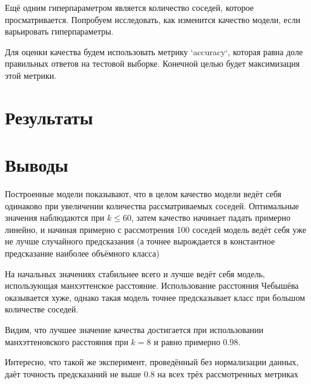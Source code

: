 \documentclass{article}
\begin{document}
\bigskip
Ещё одним гиперпараметром является количество соседей, которое просматривается. Попробуем исследовать, как изменится качество модели, если варьировать гиперпараметры.

Для оценки качества будем использовать метрику `accuracy`, которая равна доле правильных ответов на тестовой выборке. Конечной целью будет максимизация этой метрики.

\section{Результаты}

\begin{center}
\end{center}

\section{Выводы}

Построенные модели показывают, что в целом качество модели ведёт себя одинаково при увеличении количества рассматриваемых соседей. Оптимальные значения наблюдаются при $k \leqslant 60$, затем качество начинает падать примерно линейно, и  начиная примерно с рассмотрения 100 соседей модель ведёт себя уже не лучше случайного предсказания (а точнее вырождается в константное предсказание наиболее объёмного класса)

На начальных значениях стабильнее всего и лучше ведёт себя модель, использующая манхэттенское расстояние. Использование расстояния Чебышёва оказывается хуже, однако такая модель точнее предсказывает класс при большом количестве соседей.

Видим, что лучшее значение качества достигается при использовании манхэттеновского расстояния при $k = 8$ и равно примерно $0.98$.

Интересно, что такой же эксперимент, проведённый без нормализации данных, даёт точность предсказаний не выше $0.8$ на всех трёх рассмотренных метриках
\end{document}
